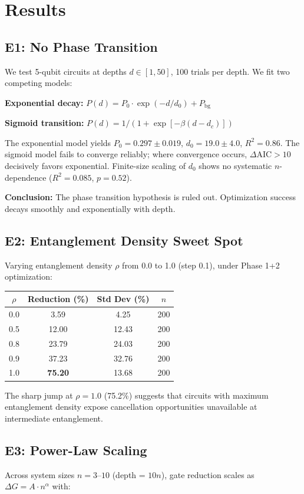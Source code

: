 \documentclass[aps,preprint,secnum,lined]{revtex4-2}
\begin{document}
\section{Results}

\subsection{E1: No Phase Transition}
We test 5-qubit circuits at depths $d \in [1, 50]$, 100 trials per depth. We fit two competing models:

\textbf{Exponential decay:} $P(d) = P_0 \cdot \exp(-d/d_0) + P_{\text{bg}}$

\textbf{Sigmoid transition:} $P(d) = 1/(1 + \exp[-\beta(d - d_c)])$

The exponential model yields $P_0 = 0.297 \pm 0.019$, $d_0 = 19.0 \pm 4.0$, $R^2 = 0.86$. The sigmoid model fails to converge reliably; where convergence occurs, $\Delta\text{AIC} > 10$ decisively favors exponential. Finite-size scaling of $d_0$ shows no systematic $n$-dependence ($R^2 = 0.085$, $p = 0.52$).

\textbf{Conclusion:} The phase transition hypothesis is ruled out. Optimization success decays smoothly and exponentially with depth.

\subsection{E2: Entanglement Density Sweet Spot}
Varying entanglement density $\rho$ from 0.0 to 1.0 (step 0.1), under Phase 1+2 optimization:

\begin{center}
\begin{tabular}{cccc}
$\rho$ & Reduction (\%) & Std Dev (\%) & $n$ \\ \hline
0.0 & 3.59 & 4.25 & 200 \\
0.5 & 12.00 & 12.43 & 200 \\
0.8 & 23.79 & 24.03 & 200 \\
0.9 & 37.23 & 32.76 & 200 \\
1.0 & \textbf{75.20} & 13.68 & 200
\end{tabular}
\end{center}

The sharp jump at $\rho=1.0$ (75.2\%) suggests that circuits with maximum entanglement density expose cancellation opportunities unavailable at intermediate entanglement.

\subsection{E3: Power-Law Scaling}
Across system sizes $n = 3$--$10$ (depth = $10n$), gate reduction scales as $\Delta G = A \cdot n^\alpha$ with:
\end{document}
